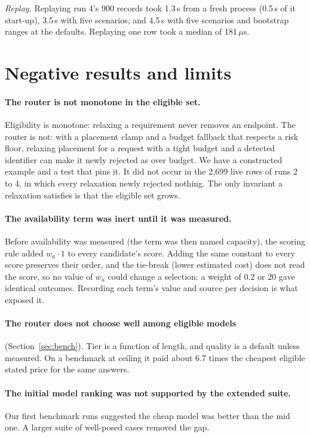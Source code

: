 \documentclass[11pt]{article}
\begin{document}
\emph{Replay.} Replaying run 4's 900 records took 1.3\,s from a fresh process (0.5\,s of it
start-up), 3.5\,s with five scenarios, and 4.5\,s with five scenarios and bootstrap ranges at
the defaults. Replaying one row took a median of 181\,$\mu$s.

\section{Negative results and limits}
\label{sec:neg}

\paragraph{The router is not monotone in the eligible set.} Eligibility is monotone: relaxing a
requirement never removes an endpoint. The router is not: with a placement clamp and a budget
fallback that respects a risk floor, relaxing placement for a request with a tight budget and a
detected identifier can make it newly rejected as over budget. We have a constructed example and
a test that pins it. It did not occur in the 2{,}699 live rows of runs 2 to 4, in which every
relaxation newly rejected nothing. The only invariant a relaxation satisfies is that the
eligible set grows.

\paragraph{The availability term was inert until it was measured.} Before availability was
measured (the term was then named capacity), the scoring rule added $w_a \cdot 1$ to every candidate's score. Adding the same
constant to every score preserves their order, and the tie-break (lower estimated cost) does not
read the score, so no value of $w_a$ could change a selection: a weight of 0.2 or 20 gave
identical outcomes. Recording each term's value and source per decision is what exposed it.

\paragraph{The router does not choose well among eligible models} (Section~\ref{sec:bench}). Tier
is a function of length, and quality is a default unless measured. On a benchmark at ceiling it
paid about 6.7 times the cheapest eligible stated price for the same answers.

\paragraph{The initial model ranking was not supported by the extended suite.} Our first
benchmark runs suggested the cheap model was better than the mid one. A larger suite of
well-posed cases removed the gap.
\end{document}
